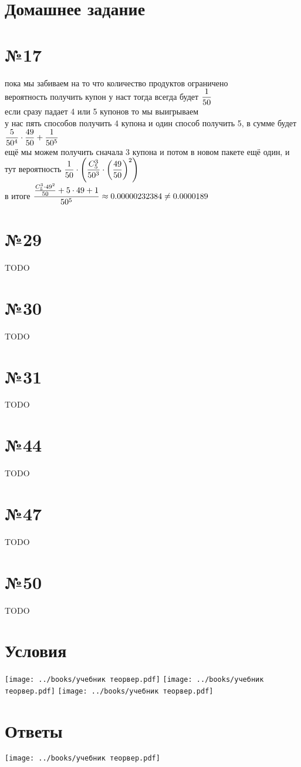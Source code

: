 \documentclass{article}
\newcommand{\hr}{\par\vspace{.5\baselineskip}\noindent\hrulefill\par}
\begin{document}
  \hr
  \section*{Домашнее задание}
  \section*{№17}
  пока мы забиваем на то что количество продуктов ограничено \\
  вероятность получить купон у наст тогда всегда будет $\displaystyle \frac{1}{50}$ \\
  если сразу падает 4 или 5 купонов то мы выигрываем \\
  у нас пять способов получить 4 купона и один способ получить 5, в сумме будет $\displaystyle \frac{5}{50^4} \cdot \frac{49}{50} + \frac{1}{50^5}$ \\
  ещё мы можем получить сначала 3 купона и потом в новом пакете ещё один, и тут вероятность
  $\displaystyle \frac{1}{50} \cdot \left(\frac{C_5^3}{50^3} \cdot \left(\frac{49}{50}\right)^2\right)$ \\
  в итоге $\displaystyle \frac{\frac{C_5^3 \cdot 49^2}{50} + 5 \cdot 49 + 1}{50^5} \approx 0.00000232384 \neq 0.0000189$

  \section*{№29}
  TODO

  \section*{№30}
  TODO

  \section*{№31}
  TODO

  \section*{№44}
  TODO

  \section*{№47}
  TODO

  \section*{№50}
  TODO


  \hr
  \section*{Условия}
  \texttt{[image: ../books/учебник теорвер.pdf]} \hfill
  \texttt{[image: ../books/учебник теорвер.pdf]} \hfill
  \texttt{[image: ../books/учебник теорвер.pdf]} \hfill

  \section*{Ответы}
  \texttt{[image: ../books/учебник теорвер.pdf]}
\end{document}
